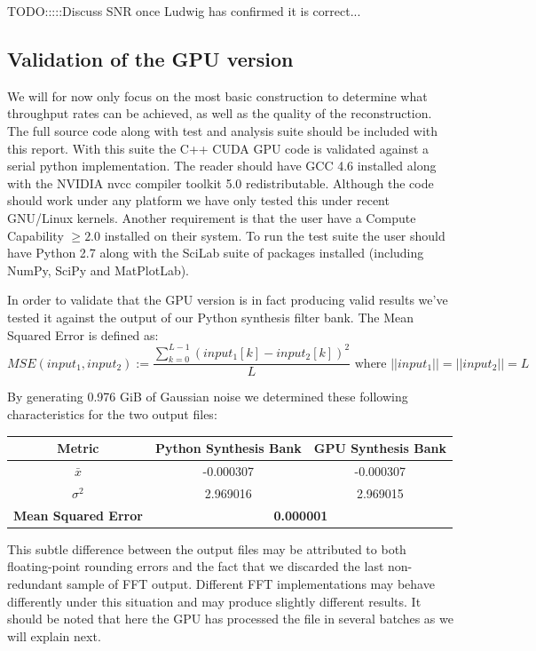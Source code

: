 \documentclass[a4paper,10pt]{article}
\begin{document}
{\color{red} TODO:::::Discuss SNR once Ludwig has confirmed it is correct...}

\subsection{Validation of the GPU version}
We will for now only focus on the most basic construction to determine what throughput rates can be achieved, as well as the quality of the reconstruction. The full source code
along with test and analysis suite should be included with this report. With this suite the C++ CUDA GPU code is validated against a serial python implementation. The reader 
should have GCC 4.6 installed along with the NVIDIA nvcc compiler toolkit 5.0 redistributable. Although the code should work under any platform we have only tested this under 
recent GNU/Linux kernels. Another requirement is that the user have a Compute Capability $\geq2.0$ installed on their system. To run the test suite the user should have 
Python 2.7 along with the SciLab suite of packages installed (including NumPy, SciPy and MatPlotLab).

In order to validate that the GPU version is in fact producing valid results we've tested it against the output of our Python synthesis filter bank. The Mean Squared Error 
is defined as:
\begin{equation}
 MSE(input_1,input_2) := \frac{\sum_{k=0}^{L-1}{(input_1[k] - input_2[k])^2}}{L} \text{ where } ||input_1|| = ||input_2|| = L
\end{equation}

By generating 0.976 GiB of Gaussian noise we determined these following characteristics for the two output files:
\begin{center}
  \begin{tabular}{|c|c|c|}
    \hline
    \textbf{Metric} & \textbf{Python Synthesis Bank} & \textbf{GPU Synthesis Bank} \\
    \hline
    $\bar x$ & -0.000307 & -0.000307 \\
    \hline
    $\sigma^{2}$ & 2.969016 & 2.969015 \\
    \hline
    \textbf{Mean Squared Error} & \multicolumn{2}{|c|}{\textbf{0.000001}} \\
    \hline
  \end{tabular}
\end{center}

This subtle difference between the output files may be attributed to both floating-point rounding errors and the fact that we discarded the last non-redundant
sample of FFT output. Different FFT implementations may behave differently under this situation and may produce slightly different results. It should be noted
that here the GPU has processed the file in several batches as we will explain next.
\end{document}
